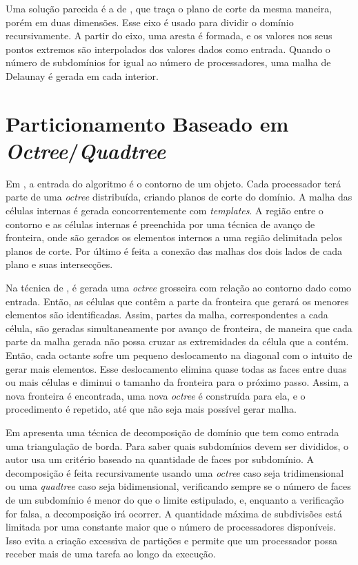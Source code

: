 Uma solução parecida é a de \cite{bib:Lammer00}, que traça o plano de corte da mesma maneira, porém em duas dimensões. Esse eixo é usado para dividir o domínio recursivamente. A partir do eixo, uma aresta é formada, e os valores nos seus pontos extremos são interpolados dos valores dados como entrada. Quando o número de subdomínios for igual ao número de processadores, uma malha de Delaunay é gerada em cada interior.

\section{Particionamento Baseado em \textit{Octree}/\textit{Quadtree}}

Em \cite{bib:deCougny99}, a entrada do algoritmo é o contorno de um objeto. Cada processador terá parte de uma \textit{octree} distribuída, criando planos de corte do domínio. A malha das células internas é gerada concorrentemente com \textit{templates}. A região entre o contorno e as células internas é preenchida por uma técnica de avanço de fronteira, onde são gerados os elementos internos a uma região delimitada pelos planos de corte. Por último é feita a conexão das malhas dos dois lados de cada plano e suas intersecções.

Na técnica de \cite{bib:Lohner01}, é gerada uma \textit{octree} grosseira com relação ao contorno dado como entrada. Então, as células que contêm a parte da fronteira que gerará os menores elementos são identificadas. Assim, partes da malha, correspondentes a cada célula, são geradas simultaneamente por avanço de fronteira, de maneira que cada parte da malha gerada não possa cruzar as extremidades da célula que a contém. Então, cada octante sofre um pequeno deslocamento na diagonal com o intuito de gerar mais elementos. Esse deslocamento elimina quase todas as faces entre duas ou mais células e diminui o tamanho da fronteira para o próximo passo. Assim, a nova fronteira é encontrada, uma nova \textit{octree} é construída para ela, e o procedimento é repetido, até que não seja mais possível gerar malha.

Em \cite{bib:Larwood03} apresenta uma técnica de decomposição de domínio que tem como entrada uma triangulação de borda. Para saber quais subdomínios devem ser divididos, o autor usa um critério baseado na quantidade de faces por subdomínio. A decomposição é feita recursivamente usando uma \textit{octree} caso seja tridimensional ou uma \textit{quadtree} caso seja bidimensional, verificando sempre se o número de faces de um subdomínio é menor do que o limite estipulado, e, enquanto a verificação for falsa, a decomposição irá ocorrer. A quantidade máxima de subdivisões está limitada por uma constante maior que o número de processadores disponíveis. Isso evita a criação excessiva de partições e permite que um processador possa receber mais de uma tarefa ao longo da execução.

